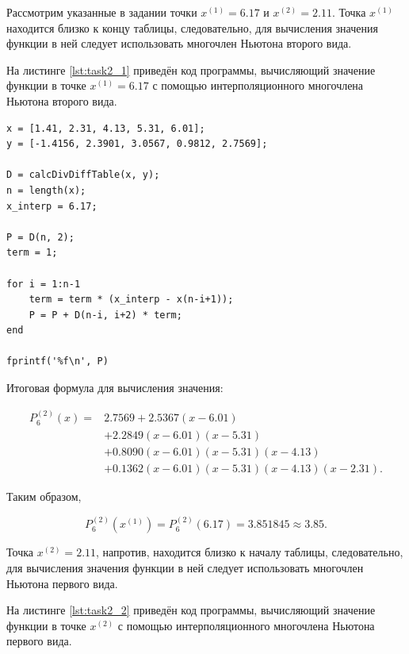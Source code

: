 Рассмотрим указанные в задании точки $x^{(1)} = 6.17$ и $x^{(2)} = 2.11$. Точка $x^{(1)}$ находится близко к концу таблицы, следовательно, для вычисления значения функции в ней следует использовать многочлен Ньютона второго вида.

На листинге \ref{lst:task2_1} приведён код программы, вычисляющий значение функции в точке $x^{(1)} = 6.17$ с помощью интерполяционного многочлена Ньютона второго вида.

\begin{listing}[H]
\caption{Вычисление значения функции в точке $x^{(1)} = 6.17$ помощью многочлена Ньютона второго вида}
\vspace{-20pt}
\label{lst:task2_1}
\begin{verbatim}
x = [1.41, 2.31, 4.13, 5.31, 6.01];
y = [-1.4156, 2.3901, 3.0567, 0.9812, 2.7569];

D = calcDivDiffTable(x, y);
n = length(x);
x_interp = 6.17;

P = D(n, 2);
term = 1;

for i = 1:n-1
    term = term * (x_interp - x(n-i+1));
    P = P + D(n-i, i+2) * term;
end

fprintf('%f\n', P)
\end{verbatim}
\end{listing}

Итоговая формула для вычисления значения:

\[
\begin{aligned}
P_6^{(2)}(x)={}&
2.7569
+2.5367(x-6.01)\\
&+2.2849(x-6.01)(x-5.31)\\
&+0.8090(x-6.01)(x-5.31)(x-4.13)\\
&+0.1362(x-6.01)(x-5.31)(x-4.13)(x-2.31).
\end{aligned}
\]

Таким образом,

\[
P_6^{(2)}(x^{(1)}) = P_6^{(2)}(6.17) = 3.851845 \approx 3.85.
\]

Точка $x^{(2)} = 2.11$, напротив, находится близко к началу таблицы, следовательно, для вычисления значения функции в ней следует использовать многочлен Ньютона первого вида.

На листинге \ref{lst:task2_2} приведён код программы, вычисляющий значение функции в точке $x^{(2)}$ с помощью интерполяционного многочлена Ньютона первого вида.

